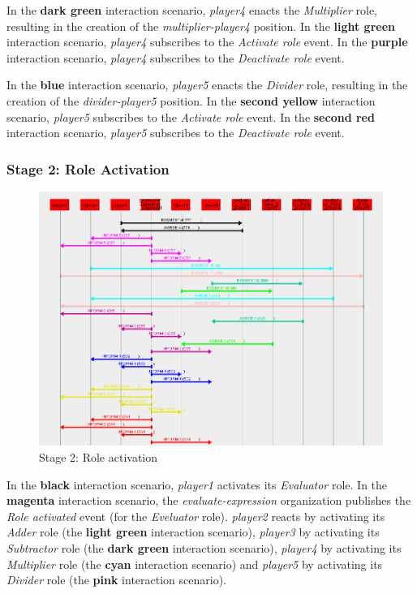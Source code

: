 In the \textbf{dark green} interaction scenario, \textit{player4} enacts the \textit{Multiplier} role, resulting in the creation of the \textit{multiplier-player4} position.
In the \textbf{light green} interaction scenario, \textit{player4} subscribes to the \textit{Activate role} event.
In the \textbf{purple} interaction scenario, \textit{player4} subscribes to the \textit{Deactivate role} event.

In the \textbf{blue} interaction scenario, \textit{player5} enacts the \textit{Divider} role, resulting in the creation of the \textit{divider-player5} position.
In the \textbf{second yellow} interaction scenario, \textit{player5} subscribes to the \textit{Activate role} event.
In the \textbf{second red} interaction scenario, \textit{player5} subscribes to the \textit{Deactivate role} event.

\subsubsection*{Stage 2: Role Activation}

\begin{figure}[H]
	\centering
	\includegraphics[width=\textwidth]{images/example2-stage2.png}
	\caption{Stage 2: Role activation}
	\label{figure:example2-stage2}
\end{figure}

In the \textbf{black} interaction scenario, \textit{player1} activates its \textit{Evaluator} role.
In the \textbf{magenta} interaction scenario, the \textit{evaluate-expression} organization publishes the \textit{Role activated} event (for the \textit{Eveluator} role).
\textit{player2} reacts by activating its \textit{Adder} role (the \textbf{light green} interaction scenario), \textit{player3} by activating its \textit{Subtractor} role (the \textbf{dark green} interaction scenario), \textit{player4} by activating its \textit{Multiplier} role (the \textbf{cyan} interaction scenario) and \textit{player5} by activating its \textit{Divider} role (the \textbf{pink} interaction scenario).

